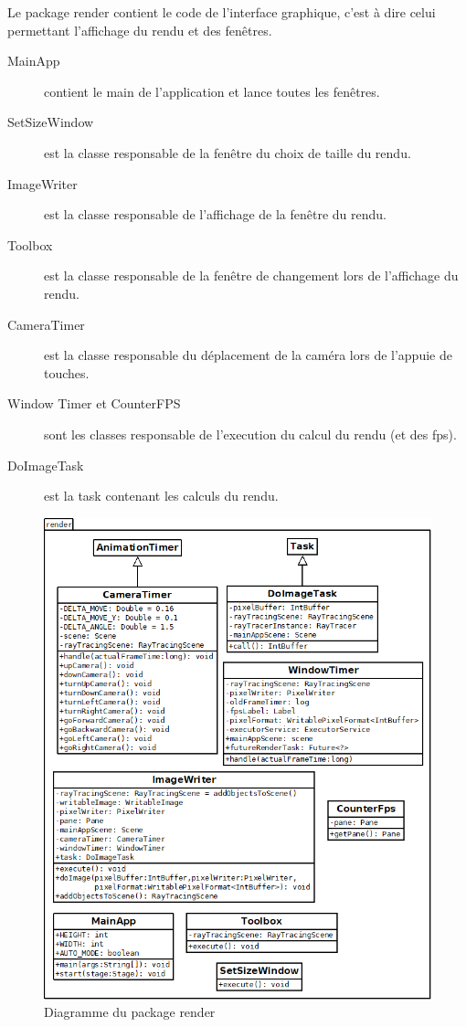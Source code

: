 Le package render contient le code de l'interface graphique, c'est à dire celui permettant l'affichage du rendu et des fenêtres.

\begin{description}
    \item [MainApp] contient le main de l'application et lance toutes les fenêtres.
    \item [SetSizeWindow] est la classe responsable de la fenêtre du choix de taille du rendu.
    \item [ImageWriter] est la classe responsable de l'affichage de la fenêtre du rendu.
    \item [Toolbox] est la classe responsable de la fenêtre de changement lors de l'affichage du rendu.
    \item [CameraTimer] est la classe responsable du déplacement de la caméra lors de l'appuie de touches.
    \item [Window Timer et CounterFPS] sont les classes responsable de l'execution du calcul du rendu (et des fps).
    \item [DoImageTask] est la task contenant les calculs du rendu.
\end{description}



\begin{figure}[h]
   \begin{center}
       \includegraphics[scale=0.5]{img/render.javafx/diagClassRender.png}
   \end{center}
   \caption{Diagramme du package render}
\end{figure}
